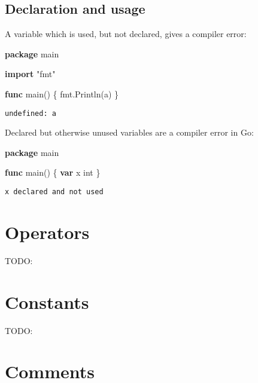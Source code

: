 \documentclass[]{book}
\newenvironment{Shaded}{\begin{snugshade}}{\end{snugshade}}
\newcommand{\DataTypeTok}[1]{\textcolor[rgb]{0.13,0.29,0.53}{#1}}
\newcommand{\KeywordTok}[1]{\textcolor[rgb]{0.13,0.29,0.53}{\textbf{#1}}}
\newcommand{\NormalTok}[1]{#1}
\newcommand{\StringTok}[1]{\textcolor[rgb]{0.31,0.60,0.02}{#1}}
\begin{document}
\hypertarget{declaration-and-usage}{%
\subsection{Declaration and usage}\label{declaration-and-usage}}

A variable which is used, but not declared, gives a compiler error:

\begin{Shaded}
\begin{Highlighting}[]
\KeywordTok{package}\NormalTok{ main}

\KeywordTok{import} \StringTok{"fmt"}

\KeywordTok{func}\NormalTok{ main() \{}
\NormalTok{    fmt.Println(a)}
\NormalTok{\}}
\end{Highlighting}
\end{Shaded}

\begin{verbatim}
undefined: a
\end{verbatim}

Declared but otherwise unused variables are a compiler error in Go:

\begin{Shaded}
\begin{Highlighting}[]
\KeywordTok{package}\NormalTok{ main}

\KeywordTok{func}\NormalTok{ main() \{}
    \KeywordTok{var}\NormalTok{ x }\DataTypeTok{int}
\NormalTok{\}}
\end{Highlighting}
\end{Shaded}

\begin{verbatim}
x declared and not used
\end{verbatim}

\hypertarget{operators}{%
\section{Operators}\label{operators}}

TODO:

\hypertarget{constants}{%
\section{Constants}\label{constants}}

TODO:

\hypertarget{comments}{%
\section{Comments}\label{comments}}
\end{document}
